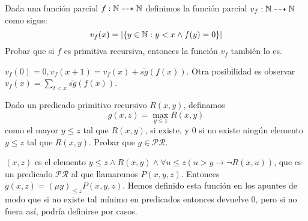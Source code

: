 \documentclass[twoside]{article}
\begin{document}
\newpage

\begin{ejercicio}{15}
Dada una función parcial $f : \mathbb{N} \dashrightarrow \mathbb{N}$ definimos la función parcial $v_f : \mathbb{N}\dashrightarrow \mathbb{N}$
como sigue:
\[ v_f (x) = |\{y \in \mathbb{N} : y < x \land f(y) = 0\}|\]
Probar que si $f$ es primitiva recursiva, entonces la función $v_f$ también lo es.

\end{ejercicio}
\begin{solucion}
$v_f(0)=0, v_f(x+1)=v_f(x)+\overline{sg}(f(x))$. Otra posibilidad es observar $v_f(x)=\sum_{t< x}\overline{sg}(f(x))$. 
\end{solucion}

\newpage

\begin{ejercicio}{16}
Dado un predicado primitivo recursivo $R(x, y)$, definamos
\[g(x, z) = \max_{y\leq z}R(x, y)\]
como el mayor $y \leq z$ tal que $R(x, y)$, si existe, y 0 si no existe ningún elemento $y \leq z$ tal que
$R(x, y)$. Probar que $g \in \mathcal{PR}$.
\end{ejercicio}
\begin{solucion}
$(x,z)$ es el elemento $y\leq z\land R(x,y)\land \forall u\leq z(u>y\rightarrow \neg R(x,u))$, que es un predicado $\mathcal{PR}$ al que llamaremos $P(x,y,z)$. Entonces $g(x,z)=(\mu y)_{\leq z} P(x,y,z)$. Hemos definido esta función en los apuntes de modo que si no existe tal mínimo en predicados entonces devuelve 0, pero si no fuera así, podría definirse por casos.
\end{solucion}

\newpage
\end{document}
